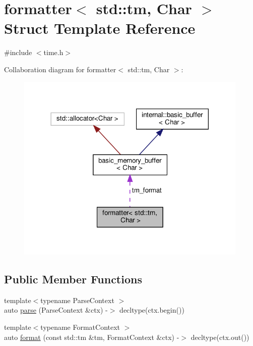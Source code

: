 \hypertarget{structformatter_3_01std_1_1tm_00_01_char_01_4}{}\section{formatter$<$ std\+:\+:tm, Char $>$ Struct Template Reference}
\label{structformatter_3_01std_1_1tm_00_01_char_01_4}


{\ttfamily \#include $<$time.\+h$>$}



Collaboration diagram for formatter$<$ std\+:\+:tm, Char $>$\+:
\nopagebreak
\begin{figure}[H]
\begin{center}
\leavevmode
\includegraphics[width=314pt]{structformatter_3_01std_1_1tm_00_01_char_01_4__coll__graph}
\end{center}
\end{figure}
\subsection*{Public Member Functions}
\begin{DoxyCompactItemize}
\item 
{\footnotesize template$<$typename Parse\+Context $>$ }\\auto \hyperlink{structformatter_3_01std_1_1tm_00_01_char_01_4_a48e18c3d8fc0bf234d6981a60828f5ca}{parse} (Parse\+Context \&ctx) -\/$>$ decltype(ctx.\+begin())
\item 
{\footnotesize template$<$typename Format\+Context $>$ }\\auto \hyperlink{structformatter_3_01std_1_1tm_00_01_char_01_4_ab9ede05d9788f38bfc435af29d7fefe0}{format} (const std\+::tm \&tm, Format\+Context \&ctx) -\/$>$ decltype(ctx.\+out())
\end{DoxyCompactItemize}
